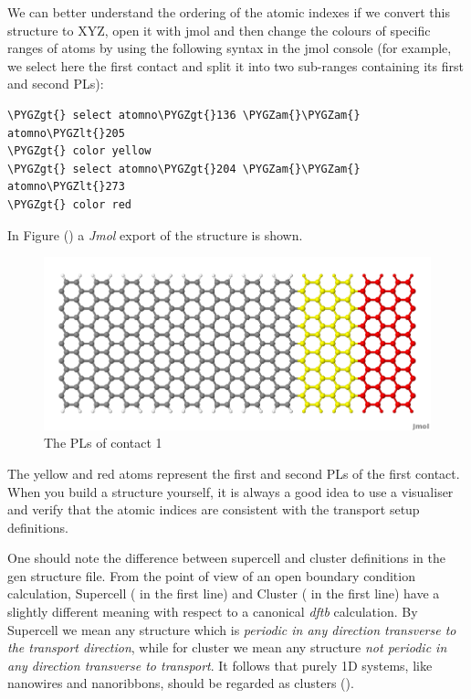 \documentclass[a4paper,11pt,english]{sphinxmanual}
\def\PYGZam{\char`\&}
\def\PYGZlt{\char`\<}
\def\PYGZgt{\char`\>}
\begin{document}
{{We can better
understand the ordering of the atomic indexes if we convert this
structure to XYZ, open it with jmol and then change the colours of
specific ranges of atoms by using the following syntax in the jmol
console (for example, we select here the first contact and split it
into two sub-ranges containing its first and second PLs):

\begin{Verbatim}[commandchars=\\\{\}]
\PYGZgt{} select atomno\PYGZgt{}136 \PYGZam{}\PYGZam{} atomno\PYGZlt{}205
\PYGZgt{} color yellow
\PYGZgt{} select atomno\PYGZgt{}204 \PYGZam{}\PYGZam{} atomno\PYGZlt{}273
\PYGZgt{} color red
\end{Verbatim}

In Figure {\hyperref[transport:fig-color-device-7]{\emph{}}} () a \emph{Jmol} export of the structure is shown.
\begin{figure}[htbp]
\centering
\capstart

\includegraphics[width=0.800\linewidth]{color_device_7.png}
\caption{The PLs of contact 1}\label{transport:fig-color-device-7}\end{figure}

The yellow and red atoms represent the first and second PLs of the
first contact. When you build a structure yourself, it is always a
good idea to use a visualiser and verify that the atomic indices are
consistent with the transport setup definitions.

One should note the difference between supercell and cluster definitions in the gen
structure file. From the point of view of an open boundary condition
calculation, Supercell ( in the first line) and Cluster ( in the first line) have a slightly
different meaning with respect to a canonical \emph{dftb} calculation. By
Supercell we mean any structure which is \emph{periodic in any direction
transverse to the transport direction}, while for cluster we mean any
structure \emph{not periodic in any direction transverse to transport}. It
follows that purely 1D systems, like nanowires and nanoribbons, should
be regarded as clusters ().

}}
\end{document}
